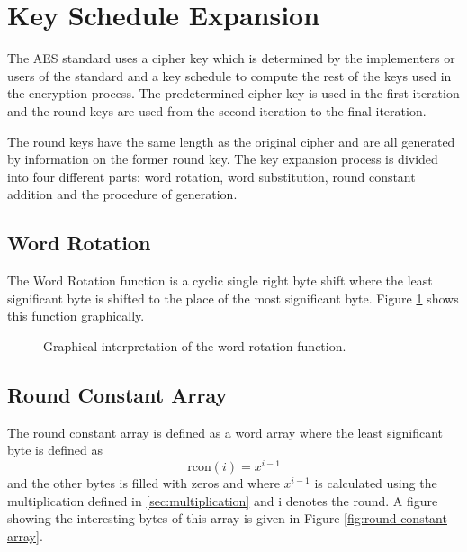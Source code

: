 \documentclass[report.tex]{subfiles}
\begin{document}
\section{Key Schedule Expansion} \label{key schedule}

The AES standard uses a cipher key which is determined by the implementers or users of the standard and a key schedule to compute the rest of the keys used in the encryption process. %
The predetermined cipher key is used in the first iteration and the round keys are used from the second iteration to the final iteration.

The round keys have the same length as the original cipher and are all generated by information on the former round key. The key expansion process is divided into four different parts: word rotation, word substitution, round constant addition and the procedure of generation.

\subsection{Word Rotation}
The Word Rotation function is a cyclic single right byte shift where the least significant byte is shifted to the place of the most significant byte. Figure \ref{fig:word shift} shows this function graphically.

\begin{figure}[ht]
\setlength{\unitlength}{1.0cm}
	\begin{center}
	\end{center}
	\caption{Graphical interpretation of the word rotation function.}
	\label{fig:word shift}
\end{figure}

\subsection{Round Constant Array}
The round constant array is defined as a word array where the least significant byte is defined as
\begin{equation}
	\textrm{rcon}\left(i\right) = x^{i - 1}
\end{equation}
and the other bytes is filled with zeros and where $x^{i - 1}$ is calculated using the multiplication defined in  \ref{sec:multiplication} and i denotes the round. A figure showing the interesting bytes of this array is given in Figure \ref{fig:round constant array}.
\end{document}
